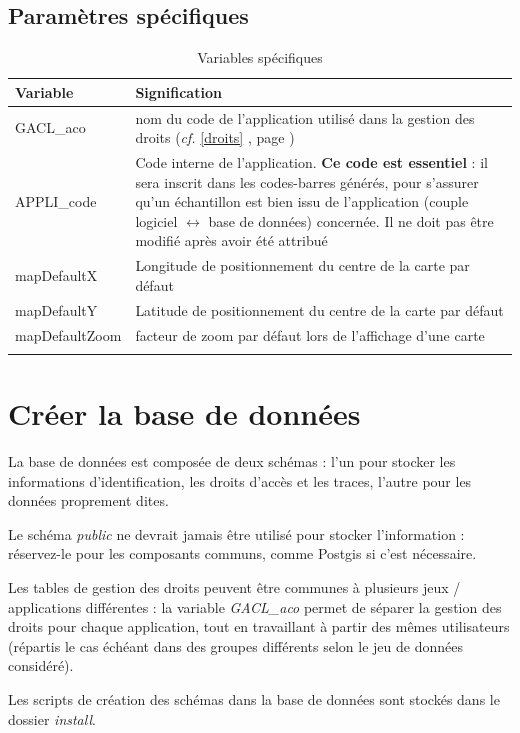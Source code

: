 \subsection{Paramètres spécifiques}
\label{paramspec}

\begin{longtable}{|p{4cm}|p{11cm}|}
\hline
\textbf{Variable} & \textbf{Signification} \\
\hline
\endhead
GACL\_aco & nom du code de l'application utilisé dans la gestion des droits (\textit{cf.} \ref{droits} \textit{\nameref{droits}}, page \pageref{droits} )\\
\hline
APPLI\_code & Code interne de l'application. \textbf{Ce code est essentiel} : il sera inscrit dans les codes-barres générés, pour s'assurer qu'un échantillon est bien issu de l'application (couple logiciel $\leftrightarrow$ base de données) concernée. Il ne doit pas être modifié après avoir été attribué\\
\hline
mapDefaultX & Longitude de positionnement du centre de la carte par défaut \\
\hline
mapDefaultY & Latitude de positionnement du centre de la carte par défaut \\
\hline
mapDefaultZoom & facteur de zoom par défaut lors de l'affichage d'une carte \\
\hline
\caption{Variables spécifiques}
\end{longtable}

\section{Créer la base de données}

La base de données est composée de deux schémas : l'un pour stocker les informations d'identification, les droits d'accès et les traces, l'autre pour les données proprement dites.

Le schéma \textit{public} ne devrait jamais être utilisé pour stocker l'information : réservez-le pour les composants communs, comme Postgis si c'est nécessaire.

Les tables de gestion des droits peuvent être communes à plusieurs jeux / applications différentes : la variable \textit{GACL\_aco} permet de séparer la gestion des droits pour chaque application, tout en travaillant à partir des mêmes utilisateurs (répartis le cas échéant dans des groupes différents selon le jeu de données considéré).

Les scripts de création des schémas dans la base de données sont stockés dans le dossier \textit{install}. 



